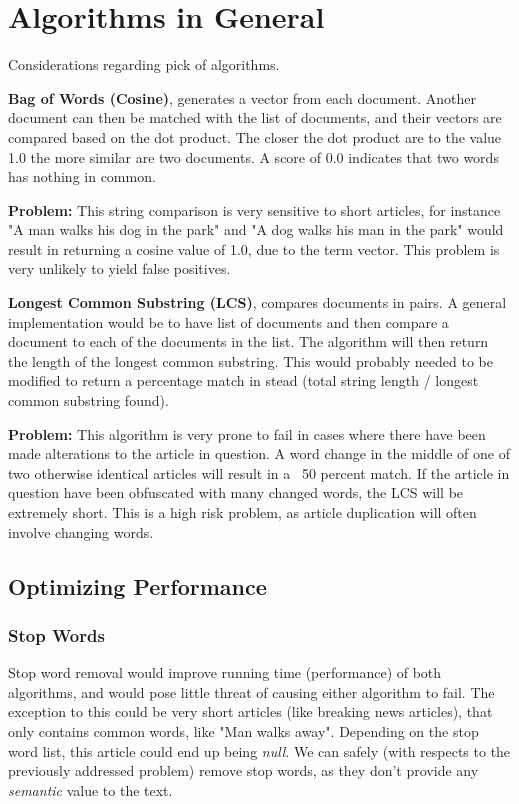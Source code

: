 \chapter{Algorithms in General}

Considerations regarding pick of algorithms. 

\textbf{Bag of Words (Cosine)}, generates a vector from each document.
Another document can then be matched with the list of documents, and their vectors are compared based on the dot product. The closer the dot product are to the value 1.0 the more similar are two documents. A score of 0.0 indicates that two words has nothing in common.

\textbf{Problem:} This string comparison is very sensitive to short articles, for instance "A man walks his dog in the park" and "A dog walks his man in the park" would result in returning a cosine value of 1.0, due to the term vector. This problem is very unlikely to yield false positives.

\textbf{Longest Common Substring (LCS)}, compares documents in pairs. A general implementation would be to have list of documents and then compare a document to each of the documents in the list. The algorithm will then return the length of the longest common substring. This would probably needed to be modified to return a percentage match in stead (total string length / longest common substring found).

\textbf{Problem:} This algorithm is very prone to fail in cases where there have been made alterations to the article in question. A word change in the middle of one of two otherwise identical articles will result in a ~50 percent match. If the article in question have been obfuscated with many changed words, the LCS will be extremely short. This is a high risk problem, as article duplication will often involve changing words.


\section{Optimizing Performance}
\subsection{Stop Words}
Stop word removal would improve running time (performance) of both algorithms, and would pose little threat of causing either algorithm to fail. The exception to this could be very short articles (like breaking news articles), that only contains common words, like "Man walks away". Depending on the stop word list, this article could end up being \textit{null}.
We can safely (with respects to the previously addressed problem) remove stop words, as they don't provide any \textit{semantic} value to the text.

